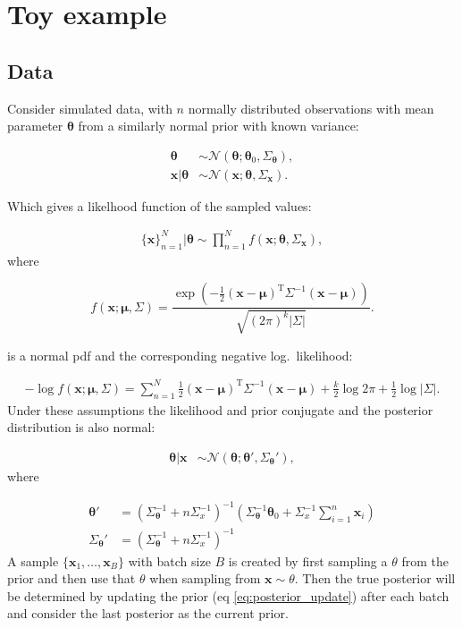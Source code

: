 \section{Toy example}

\subsection{Data}

Consider simulated data, with $n$ normally distributed observations with mean parameter $\bm{\theta}$ from a similarly normal prior with known variance:

\begin{align}
  \bm{\theta} &\sim \mathcal{N}(\bm{\theta}; \bm{\theta}_0, \Sigma_{\bm{\theta}}), \nonumber \\
  \bm{x} | \bm{\theta} &\sim \mathcal{N}(\bm{x}; \bm{\theta}, \Sigma_{\bm{x}}).
\end{align}

Which gives a likelhood function of the sampled values:

\begin{align}
  \{\bm{x}\}_{n=1}^N | \bm{\theta} \sim \prod_{n=1}^N f(\bm{x}; \bm{\theta}, \Sigma_{\bm{x}}),
\end{align}
where

\begin{equation}
  f \left( \bm{x}; \bm{\mu}, \Sigma \right) =
  \frac{ \exp \left( -\frac{ 1 }{ 2 } ( \bm {x} - \bm{\mu} )^{ \mathrm {T} }{ \Sigma }^{-1} ( \bm{x} - \bm{\mu} ) \right)} { \sqrt{ ( 2\pi )^{k} | \Sigma | } }.
\end{equation}

is a normal pdf and the corresponding negative log.\ likelihood:

\begin{align}
  -\log f \left( \bm{x}; \bm{\mu}, \Sigma \right) = \sum_{n=1}^N \frac{ 1 }{ 2 } ( \bm {x} - \bm{\mu} )^{ \mathrm {T} }{ \Sigma }^{-1} ( \bm{x} - \bm{\mu} ) + \frac{k}{2} \log 2\pi  + \frac{1}{2} \log | \Sigma | .
\end{align}
Under these assumptions the likelihood and prior conjugate and the posterior distribution is also normal:

\begin{align}
  \bm{\theta}|\bm{x} &\sim \mathcal{N}(\bm{\theta}; \bm{\theta}', \Sigma_{\bm{\theta}}') \nonumber,
\end{align}
where

\begin{align}
  \bm{\theta}' &= \left( \Sigma_{\bm{\theta}}^{-1} + n \Sigma_x^{-1}\right)^{-1} \left( \Sigma_{\bm{\theta}}^{-1} \bm{\theta}_{0} + \Sigma_x^{-1} \sum_{i=1}^{n} \bm{x}_{i} \right) \nonumber \\
  \Sigma_{\bm{\theta}}' &=\left( \Sigma_{\bm{\theta}}^{-1} + n \Sigma_x^{-1}\right)^{-1}
  \label{eq:posterior_update}
\end{align}
A sample $\{\bm{x}_1, \dots, \bm{x}_B \}$ with batch size $B$ is created by first sampling a $\theta$ from the prior and then use that $\theta$ when sampling from $ \bm{x} \sim \theta $.
Then the true posterior will be determined by updating the prior (eq \eqref{eq:posterior_update}) after each batch and consider the last posterior as the current prior.

